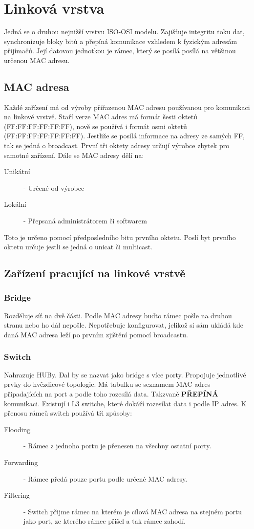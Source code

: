 \section{Linková vrstva}
\label{sec:linkova-vrstva}
Jedná se o druhou nejnižší vrstvu ISO-OSI modelu.
Zajišťuje integritu toku dat, synchronizuje bloky bitů a přepíná komunikace vzhledem k fyzickým adresám přijímačů.
Její datovou jednotkou je rámec, který se posílá posílá na většinou určenou MAC adresu.
\subsection{MAC adresa}
Každé zařízení má od výroby přiřazenou MAC adresu používanou pro komunikaci na linkové vrstvě.
Staří verze MAC adres má formát šesti oktetů (FF:FF:FF:FF:FF:FF), nově se používá i formát osmi oktetů (FF:FF:FF:FF:FF:FF:FF).
Jestliže se posílá informace na adresy ze samých FF, tak se jedná o broadcast.
První tři oktety adresy určují výrobce zbytek pro samotné zařízení.
Dále se MAC adresy dělí na:\\
\begin{description}
  \item[Unikátní]- Určené od výrobce
  \item[Lokální]- Přepsaná administrátorem či softwarem\\
\end{description}
Toto je určeno pomocí předposledního bitu prvního oktetu.
Poslí byt prvního oktetu určuje jestli se jedná o unicat či multicast.
\subsection{Zařízení pracující na linkové vrstvě}
\subsubsection{Bridge}
Rozděluje síť na dvě části.
Podle MAC adresy buďto rámec pošle na druhou stranu nebo ho dál nepošle.
Nepotřebuje konfigurovat, jelikož si sám ukládá kde daná MAC adresa leží po prvním zjištění pomocí broadcastu.
\subsubsection{Switch}
\label{subsubsec:switch}
Nahrazuje HUBy.
Dal by se nazvat jako bridge s více porty.
Propojuje jednotlivé prvky do hvězdicové topologie.
Má tabulku se seznamem MAC adres připadajících na port a podle toho rozesílá data.
Takzvaně \textbf{PŘEPÍNÁ} komunikaci.
Existují i L3 switche, které dokáží rozesílat data i podle IP adres.
K přenosu rámců switch používá tři způsoby:\\
\begin{description}
  \item[Flooding]- Rámec z jednoho portu je přenesen na všechny ostatní porty.
  \item[Forwarding]- Rámec předá pouze portu podle určené MAC adresy.
  \item[Filtering]- Switch přijme rámec na kterém je cílová MAC adresa na stejném portu jako port, ze kterého rámec přišel a tak rámec zahodí.
\end{description}
